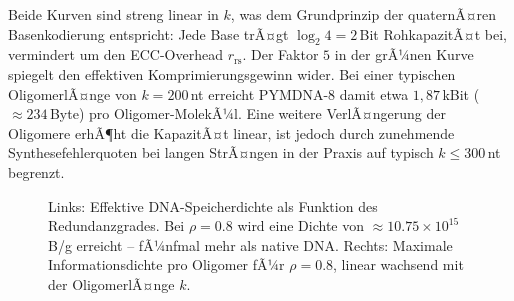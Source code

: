 ﻿\documentclass[a4paper,12pt]{article}
\theoremstyle{definition}
\begin{document}
Beide Kurven sind streng linear in $k$, was dem Grundprinzip der quaternÃ¤ren Basenkodierung entspricht: Jede Base trÃ¤gt $\log_2 4 = 2$\,Bit RohkapazitÃ¤t bei, vermindert um den ECC-Overhead $r_{\mathrm{rs}}$. Der Faktor $5$ in der grÃ¼nen Kurve spiegelt den effektiven Komprimierungsgewinn wider. Bei einer typischen OligomerlÃ¤nge von $k = 200$\,nt erreicht PYMDNA-8 damit etwa $1{,}87$\,kBit ($\approx 234$\,Byte) pro Oligomer-MolekÃ¼l. Eine weitere VerlÃ¤ngerung der Oligomere erhÃ¶ht die KapazitÃ¤t linear, ist jedoch durch zunehmende Synthesefehlerquoten bei langen StrÃ¤ngen in der Praxis auf typisch $k \leq 300$\,nt begrenzt.

\begin{figure}[H]
  \centering
  \hspace{0.02\textwidth}%
  \caption{Links: Effektive DNA-Speicherdichte als Funktion des Redundanzgrades.
    Bei $\rho = 0.8$ wird eine Dichte von $\approx 10.75 \times 10^{15}$\,B/g
    erreicht -- fÃ¼nfmal mehr als native DNA.
    Rechts: Maximale Informationsdichte pro Oligomer fÃ¼r $\rho=0.8$,
    linear wachsend mit der OligomerlÃ¤nge $k$.}
  \label{fig:dichte_komprimierung}
\end{figure}
\end{document}
